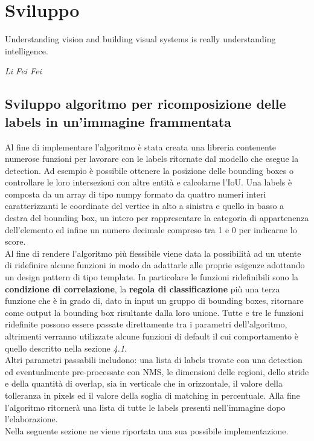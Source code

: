 \section{Sviluppo}
\epigraph{Understanding vision and building visual systems is really understanding intelligence.}{\textit{Li Fei Fei}}
\subsection{Sviluppo algoritmo per ricomposizione delle labels in un'immagine frammentata}
Al fine di implementare l'algoritmo è stata creata una libreria contenente numerose funzioni per lavorare con le labels ritornate dal modello che esegue la detection. Ad esempio è possibile ottenere la posizione delle bounding boxes o controllare le loro intersezioni con altre entità e calcolarne l'IoU. Una labels è composta da un array di tipo numpy formato da quattro numeri interi caratterizzanti le coordinate del vertice in alto a sinistra e quello in basso a destra del bounding box, un intero per rappresentare la categoria di appartenenza dell'elemento ed infine un numero decimale compreso tra 1 e 0 per indicarne lo score.\\
Al fine di rendere l'algoritmo più flessibile viene data la possibilità ad un utente di ridefinire alcune funzioni in modo da adattarle alle proprie esigenze adottando un design pattern di tipo template. In particolare le funzioni ridefinibili sono la \textbf{condizione di correlazione}, la \textbf{regola di classificazione} più una terza funzione che è in grado di, dato in input un gruppo di bounding boxes, ritornare come output la bounding box risultante dalla loro unione. Tutte e tre le funzioni ridefinite possono essere passate direttamente tra i parametri dell'algoritmo, altrimenti verranno utilizzate alcune funzioni di default il cui comportamento è quello descritto nella sezione \textit{4.1}.\\
Altri parametri passabili includono: una lista di labels trovate con una detection ed eventualmente pre-processate con NMS, le dimensioni delle regioni, dello stride e della quantità di overlap, sia in verticale che in orizzontale, il valore della tolleranza in pixels ed il valore della soglia di matching in percentuale.
Alla fine l'algoritmo ritornerà una lista di tutte le labels presenti nell'immagine dopo l'elaborazione.\\ Nella seguente sezione ne viene riportata una sua possibile implementazione.
